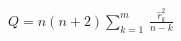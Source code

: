 \documentclass[12pt]{article}
\begin{document}
\pagestyle{empty}
\Large
{}
\pagecolor{ehandbook}

\boldmath
\begin{eqnarray*}
Q = n(n+2)\sum_{k=1}^{m} \, \frac{\hat{r}^2_k}{n-k}
\end{eqnarray*}
\end{document}
